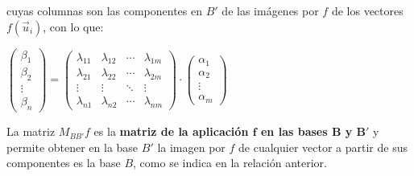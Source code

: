  cuyas columnas son las componentes en $B'$ de las imágenes por $f$ de los vectores $f(\vec u_i)$, con lo que:
 
 $\left( \begin{matrix} \beta_1 \\ \beta_2 \\ \vdots \\ \beta_n \end{matrix} \right) =   \left(  \begin{matrix}  \lambda_{11} &  \lambda_{12}& \cdots &  \lambda_{1m} \\  \lambda_{21}& \lambda_{22}&\cdots & \lambda_{2m}\\ \vdots & \vdots & \ddots & \vdots \\  \lambda_{n1}& \lambda_{n2}&\cdots&  \lambda_{nm} \end{matrix}  \right) \cdot \left( \begin{matrix} \alpha_1 \\ \alpha_2 \\ \vdots \\ \alpha_m \end{matrix} \right)$
 
 La matriz $M_{BB'}f$ es la \textbf{matriz de la aplicación $\boldsymbol{f}$ en las bases $\boldsymbol{B}$ y $\boldsymbol{B'}$} y permite obtener en la base $B'$ la imagen por $f$ de cualquier vector a partir de sus componentes es la base $B$, como se indica en la relación anterior.
 

